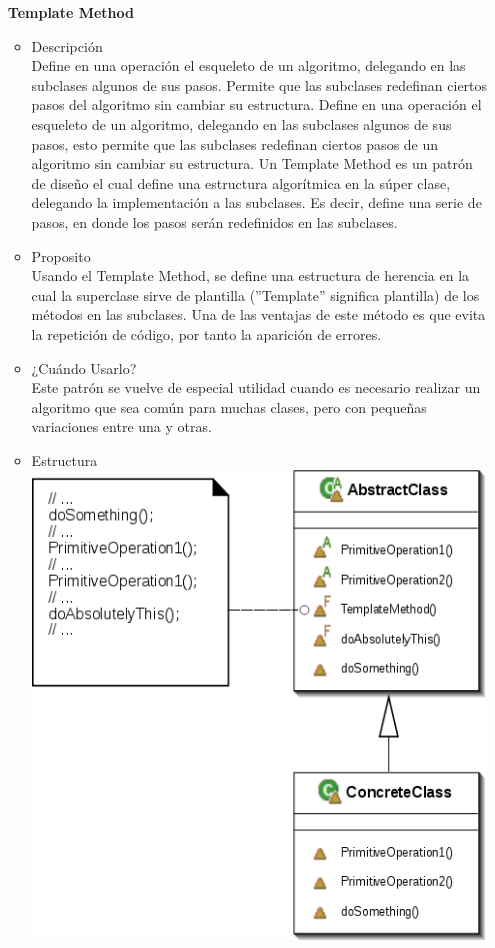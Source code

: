 \documentclass{article}
\begin{document}
\begin{enumerate}
\begin{itemize}
\item[\bf{Template Method}]
\begin{itemize}
\item{Descripción}\\

Define en una operación el esqueleto de un algoritmo, delegando en las subclases algunos de sus pasos. Permite que las subclases redefinan ciertos pasos del algoritmo sin cambiar su estructura.
Define en una operación el esqueleto de un algoritmo, delegando en las subclases algunos de sus pasos, esto permite que las subclases redefinan ciertos pasos de un algoritmo sin cambiar su estructura.
Un Template Method es un patrón de diseño el cual define una estructura algorítmica en la súper clase, delegando la implementación a las subclases. Es decir, define una serie de pasos, en donde los pasos serán redefinidos en las subclases.

\item{Proposito}\\

Usando el Template Method, se define una estructura de herencia en la cual la superclase sirve de plantilla (”Template” significa plantilla) de los métodos en las subclases. Una de las ventajas de este método es que evita la repetición de código, por tanto la aparición de errores.

\item{¿Cuándo Usarlo?}\\

Este patrón se vuelve de especial utilidad cuando es necesario realizar un algoritmo que sea común para muchas clases, pero con pequeñas variaciones entre una y otras.


\item{Estructura}\\
\includegraphics[width=12cm]{Template_Method.png}
\end{itemize}


\end{itemize}
\end{enumerate}
\end{document}

